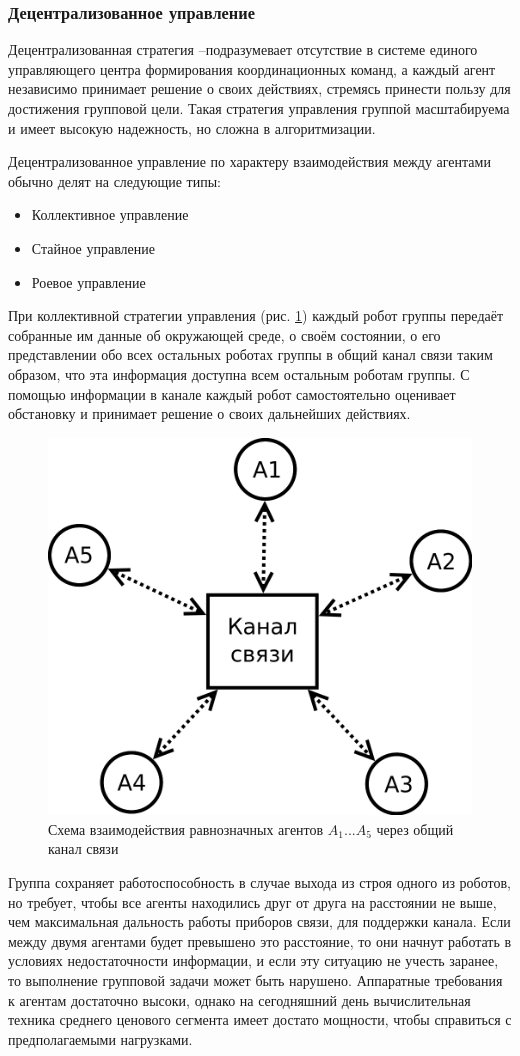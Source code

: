 \documentclass[a4paper, 14pt]{extarticle}
\begin{document}
\subsubsection{Децентрализованное управление}
Децентрализованная стратегия –подразумевает отсутствие в системе
единого управляющего центра формирования координационных команд, а
каждый агент независимо принимает решение о своих действиях, стремясь
принести пользу для достижения групповой цели. Такая стратегия управления
группой масштабируема и имеет высокую надежность, но сложна в
алгоритмизации. \par
Децентрализованное управление по характеру взаимодействия между агентами обычно делят на следующие типы: \par
\begin{itemize}
	\item Коллективное управление
	\item Стайное управление
	\item Роевое управление
\end{itemize}
\smallskip
При коллективной стратегии управления (рис. \ref{fig:decen-platoon-collective}) каждый робот группы передаёт  собранные им данные об окружающей среде, о своём состоянии, о его представлении обо всех остальных роботах группы в общий канал связи таким образом, что эта информация доступна всем остальным роботам группы. С помощью информации в канале каждый робот самостоятельно оценивает обстановку и принимает решение о своих дальнейших действиях. \par
\begin{figure}[!htbp]
	\centering
	\includegraphics[width=0.6\linewidth]{others/decen-platoon-collective2}
	\caption{Схема взаимодействия равнозначных агентов $A_1$...$A_5$ через общий канал связи}
	\label{fig:decen-platoon-collective}
\end{figure}
Группа сохраняет работоспособность в случае выхода из строя одного из роботов, но требует, чтобы все агенты находились друг от друга на расстоянии не выше, чем максимальная дальность работы приборов связи, для поддержки канала. Если между двумя агентами будет превышено это расстояние, то они начнут работать в условиях недостаточности информации, и если эту ситуацию не учесть заранее, то выполнение групповой задачи может быть нарушено. Аппаратные требования к агентам достаточно высоки, однако на сегодняшний день вычислительная техника среднего ценового сегмента имеет достато мощности, чтобы справиться с предполагаемыми нагрузками. \par
\end{document}
